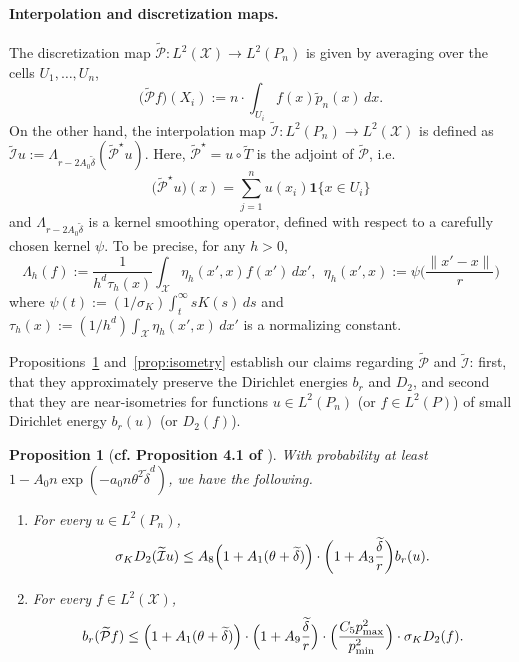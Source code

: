 \documentclass[twoside]{article}
\newcommand{\1}{\mathbf{1}}
\newcommand{\Xset}{\mathcal{X}}
\newcommand{\Leb}{L}
\newcommand{\mc}[1]{\mathcal{#1}}
\newcommand{\wt}[1]{\widetilde{#1}}
\newtheorem{proposition}{Proposition}
\theoremstyle{definition}
\theoremstyle{remark}
\begin{document}
\paragraph{Interpolation and discretization maps.}
The discretization map  $\wt{\mathcal{P}}: \Leb^2(\Xset) \to \Leb^2(P_n)$ is given by averaging over the cells $U_1,\ldots,U_n$, 
\begin{equation*}
\bigl(\wt{\mathcal{P}}f\bigr)(X_i) := n \cdot \int_{U_i} f(x) \wt{p}_n(x) \,dx.
\end{equation*}
On the other hand, the interpolation map $\wt{\mc{I}}: \Leb^2(P_n) \to \Leb^2(\Xset)$ is defined as $\wt{\mc{I}}u := \Lambda_{r - 2A_0\wt{\delta}}(\wt{\mc{P}}^{\star}u)$. Here, $\wt{\mc{P}}^{\star} = u \circ \wt{T}$ is the adjoint of $\wt{\mc{P}}$, i.e.
\begin{equation*}
\bigl(\wt{\mc{P}}^{\star}u\bigr)(x) = \sum_{j = 1}^{n} u(x_i) \1\{x \in U_i\} 
\end{equation*} 
and $\Lambda_{r - 2A_0\wt{\delta}}$ is a kernel smoothing operator, defined with respect to a carefully chosen kernel $\psi$. To be precise, for any $h > 0$,
\begin{equation*}
\Lambda_h(f) := \frac{1}{h^d\tau_h(x)}\int_{\Xset} \eta_h(x',x) f(x') \,dx',~~ \eta_h(x',x) := \psi\biggl(\frac{\|x' - x\|}{r}\biggr)
\end{equation*}
where $\psi(t) := (1/\sigma_K)\int_{t}^{\infty} s K(s) \,ds$ and $\tau_h(x) := (1/h^d)\int_{\Xset} \eta_h(x',x) \,dx'$ is a normalizing constant.

Propositions~\ref{prop:dirichlet_energies} and~\ref{prop:isometry} establish our claims regarding $\wt{\mc{P}}$ and $\wt{\mc{I}}$: first, that they approximately preserve the Dirichlet energies $b_r$ and $D_2$, and second that they are near-isometries for functions $u \in \Leb^2(P_n)$ (or $f \in \Leb^2(P)$) of small Dirichlet energy $b_r(u)$ (or $D_2(f)$).

\begin{proposition}[\textbf{cf. Proposition 4.1 of \citet{calder2019}}]
	\label{prop:dirichlet_energies}
	With probability at least $1 - A_0n\exp(-a_0n\theta^2\wt{\delta}^{d})$, we have the following.
	\begin{enumerate}[(1)]
		\item For every $u \in \Leb^2(P_n)$,
		\begin{equation}
		\label{eqn:dirichlet_energies_1}
		\sigma_{K} D_2(\wt{\mc{I}}u) \leq A_8 \Bigl(1 + A_1(\theta + \wt{\delta})\Bigr) \cdot \biggl(1 + A_3\frac{\wt{\delta}}{r}\biggr) b_r(u).
		\end{equation}
		\item For every $f \in \Leb^2(\Xset)$,
		\begin{equation}
		\label{eqn:dirichlet_energies_2}
		b_r(\wt{\mc{P}}f) \leq \Bigl(1 + A_1(\theta + \wt{\delta})\Bigr) \cdot \Bigl(1 + A_9\frac{\wt{\delta}}{r}\Bigr) \cdot \Bigl(\frac{C_5 p_{\max}^2}{p_{\min}^2}\Bigr) \cdot \sigma_{K} D_2(f).
		\end{equation}
	\end{enumerate}
\end{proposition}
\end{document}

